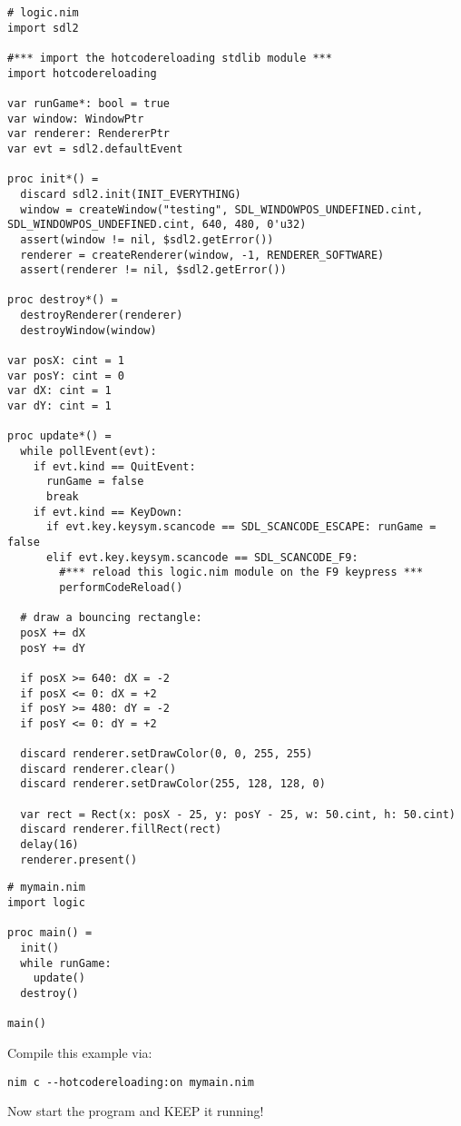 \begin{verbatim}
# logic.nim
import sdl2

#*** import the hotcodereloading stdlib module ***
import hotcodereloading

var runGame*: bool = true
var window: WindowPtr
var renderer: RendererPtr
var evt = sdl2.defaultEvent

proc init*() =
  discard sdl2.init(INIT_EVERYTHING)
  window = createWindow("testing", SDL_WINDOWPOS_UNDEFINED.cint, SDL_WINDOWPOS_UNDEFINED.cint, 640, 480, 0'u32)
  assert(window != nil, $sdl2.getError())
  renderer = createRenderer(window, -1, RENDERER_SOFTWARE)
  assert(renderer != nil, $sdl2.getError())

proc destroy*() =
  destroyRenderer(renderer)
  destroyWindow(window)

var posX: cint = 1
var posY: cint = 0
var dX: cint = 1
var dY: cint = 1

proc update*() =
  while pollEvent(evt):
    if evt.kind == QuitEvent:
      runGame = false
      break
    if evt.kind == KeyDown:
      if evt.key.keysym.scancode == SDL_SCANCODE_ESCAPE: runGame = false
      elif evt.key.keysym.scancode == SDL_SCANCODE_F9:
        #*** reload this logic.nim module on the F9 keypress ***
        performCodeReload()

  # draw a bouncing rectangle:
  posX += dX
  posY += dY

  if posX >= 640: dX = -2
  if posX <= 0: dX = +2
  if posY >= 480: dY = -2
  if posY <= 0: dY = +2

  discard renderer.setDrawColor(0, 0, 255, 255)
  discard renderer.clear()
  discard renderer.setDrawColor(255, 128, 128, 0)

  var rect = Rect(x: posX - 25, y: posY - 25, w: 50.cint, h: 50.cint)
  discard renderer.fillRect(rect)
  delay(16)
  renderer.present()
\end{verbatim}

\begin{verbatim}
# mymain.nim
import logic

proc main() =
  init()
  while runGame:
    update()
  destroy()

main()
\end{verbatim}

Compile this example via:

\begin{verbatim}
nim c --hotcodereloading:on mymain.nim
\end{verbatim}

Now start the program and KEEP it running!

